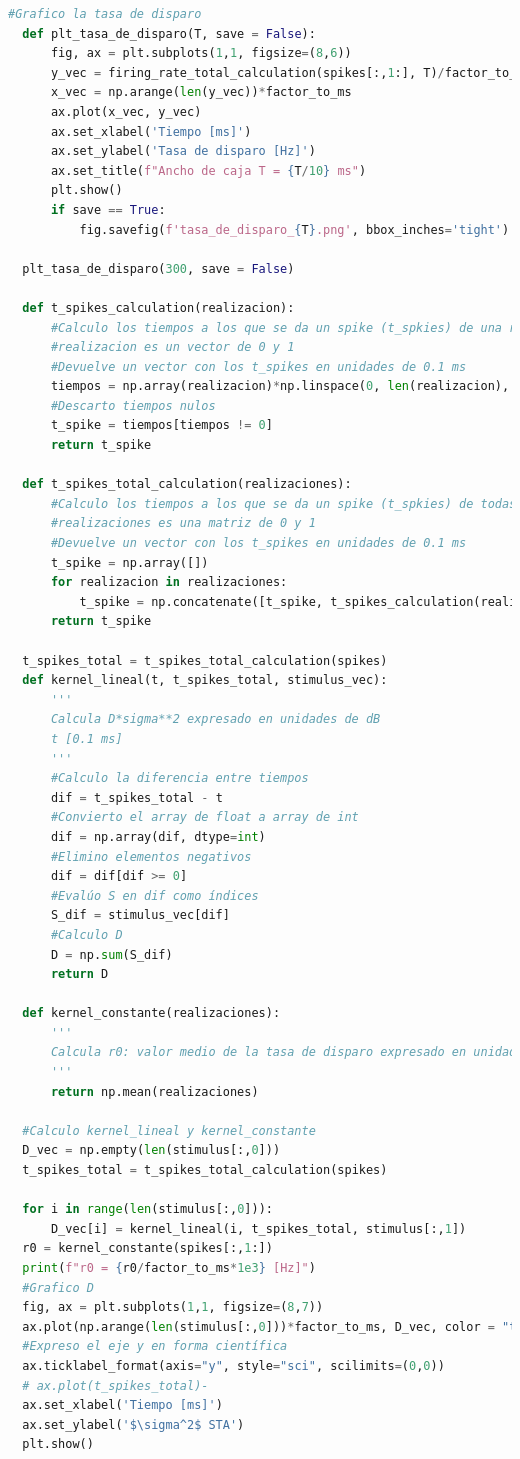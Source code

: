 \documentclass[aps,prb,twocolumn,superscriptaddress,floatfix,longbibliography]{revtex4-2}
\begin{document}
\begin{lstlisting}[language=Python]
  #Grafico la tasa de disparo
  def plt_tasa_de_disparo(T, save = False):
      fig, ax = plt.subplots(1,1, figsize=(8,6))
      y_vec = firing_rate_total_calculation(spikes[:,1:], T)/factor_to_ms*1e3
      x_vec = np.arange(len(y_vec))*factor_to_ms
      ax.plot(x_vec, y_vec)
      ax.set_xlabel('Tiempo [ms]')
      ax.set_ylabel('Tasa de disparo [Hz]')
      ax.set_title(f"Ancho de caja T = {T/10} ms")
      plt.show()
      if save == True:
          fig.savefig(f'tasa_de_disparo_{T}.png', bbox_inches='tight')
  
  plt_tasa_de_disparo(300, save = False)
  
  def t_spikes_calculation(realizacion):
      #Calculo los tiempos a los que se da un spike (t_spkies) de una realización
      #realizacion es un vector de 0 y 1
      #Devuelve un vector con los t_spikes en unidades de 0.1 ms
      tiempos = np.array(realizacion)*np.linspace(0, len(realizacion), len(realizacion))
      #Descarto tiempos nulos
      t_spike = tiempos[tiempos != 0]
      return t_spike
  
  def t_spikes_total_calculation(realizaciones):
      #Calculo los tiempos a los que se da un spike (t_spkies) de todas las realizaciones
      #realizaciones es una matriz de 0 y 1
      #Devuelve un vector con los t_spikes en unidades de 0.1 ms
      t_spike = np.array([])
      for realizacion in realizaciones:
          t_spike = np.concatenate([t_spike, t_spikes_calculation(realizacion)])
      return t_spike
  
  t_spikes_total = t_spikes_total_calculation(spikes)
  def kernel_lineal(t, t_spikes_total, stimulus_vec):
      '''
      Calcula D*sigma**2 expresado en unidades de dB
      t [0.1 ms]
      '''
      #Calculo la diferencia entre tiempos
      dif = t_spikes_total - t
      #Convierto el array de float a array de int
      dif = np.array(dif, dtype=int)
      #Elimino elementos negativos
      dif = dif[dif >= 0]
      #Evalúo S en dif como índices
      S_dif = stimulus_vec[dif]
      #Calculo D
      D = np.sum(S_dif)
      return D
  
  def kernel_constante(realizaciones):
      '''
      Calcula r0: valor medio de la tasa de disparo expresado en unidades de 1/0.1 ms
      '''
      return np.mean(realizaciones)
  
  #Calculo kernel_lineal y kernel_constante
  D_vec = np.empty(len(stimulus[:,0]))
  t_spikes_total = t_spikes_total_calculation(spikes)
  
  for i in range(len(stimulus[:,0])):
      D_vec[i] = kernel_lineal(i, t_spikes_total, stimulus[:,1])
  r0 = kernel_constante(spikes[:,1:])
  print(f"r0 = {r0/factor_to_ms*1e3} [Hz]")
  #Grafico D
  fig, ax = plt.subplots(1,1, figsize=(8,7))
  ax.plot(np.arange(len(stimulus[:,0]))*factor_to_ms, D_vec, color = "tab:blue")
  #Expreso el eje y en forma científica
  ax.ticklabel_format(axis="y", style="sci", scilimits=(0,0))
  # ax.plot(t_spikes_total)-
  ax.set_xlabel('Tiempo [ms]')
  ax.set_ylabel('$\sigma^2$ STA')
  plt.show()
  

\end{lstlisting}
\end{document}
